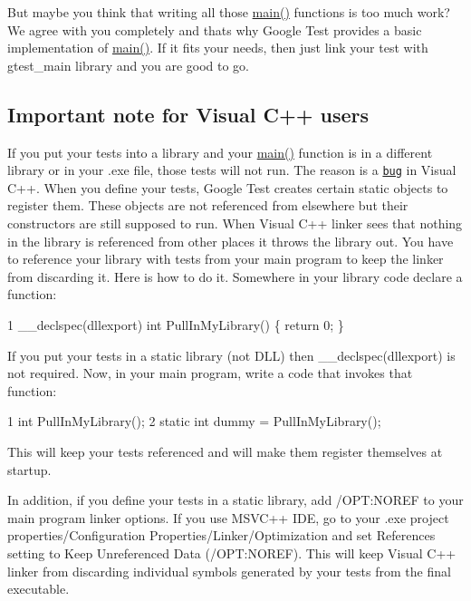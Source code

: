 But maybe you think that writing all those \hyperlink{app_2main_8cpp_ae66f6b31b5ad750f1fe042a706a4e3d4}{main()} functions is too much work? We agree with you completely and that\textquotesingle{}s why Google Test provides a basic implementation of \hyperlink{app_2main_8cpp_ae66f6b31b5ad750f1fe042a706a4e3d4}{main()}. If it fits your needs, then just link your test with gtest\+\_\+main library and you are good to go.

\subsection*{Important note for Visual C++ users}

If you put your tests into a library and your {\ttfamily \hyperlink{app_2main_8cpp_ae66f6b31b5ad750f1fe042a706a4e3d4}{main()}} function is in a different library or in your .exe file, those tests will not run. The reason is a \href{https://connect.microsoft.com/feedback/viewfeedback.aspx?FeedbackID=244410&siteid=210}{\tt bug} in Visual C++. When you define your tests, Google Test creates certain static objects to register them. These objects are not referenced from elsewhere but their constructors are still supposed to run. When Visual C++ linker sees that nothing in the library is referenced from other places it throws the library out. You have to reference your library with tests from your main program to keep the linker from discarding it. Here is how to do it. Somewhere in your library code declare a function\+: 
\begin{DoxyCode}
1 \_\_declspec(dllexport) int PullInMyLibrary() \{ return 0; \}
\end{DoxyCode}
 If you put your tests in a static library (not D\+LL) then {\ttfamily \+\_\+\+\_\+declspec(dllexport)} is not required. Now, in your main program, write a code that invokes that function\+: 
\begin{DoxyCode}
1 int PullInMyLibrary();
2 static int dummy = PullInMyLibrary();
\end{DoxyCode}
 This will keep your tests referenced and will make them register themselves at startup.

In addition, if you define your tests in a static library, add {\ttfamily /\+O\+PT\+:N\+O\+R\+EF} to your main program linker options. If you use M\+S\+V\+C++ I\+DE, go to your .exe project properties/\+Configuration Properties/\+Linker/\+Optimization and set References setting to {\ttfamily Keep Unreferenced Data (/\+O\+PT\+:N\+O\+R\+EF)}. This will keep Visual C++ linker from discarding individual symbols generated by your tests from the final executable.

